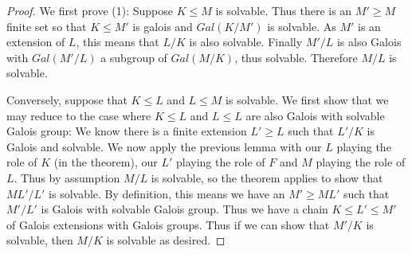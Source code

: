 \documentclass[twoside, a4paper, 10pt]{amsart}
\begin{document}
\begin{proof} We first prove (1): Suppose $K \leq M$ is solvable. Thus there is an $M' \geq M$ finite set so that $K \leq M'$ is galois and $Gal(K/M')$ is solvable. As $M'$ is an extension of $L$, this means that $L/K$ is also solvable. Finally $M'/L$ is also Galois with $Gal(M'/L)$ a subgroup of $Gal(M/K)$, thus solvable. Therefore $M/L$ is solvable.

Conversely, suppose that $K \leq L$ and $L \leq M$ is solvable. We first show that we may reduce to the case where $K \leq L$ and $L \leq L$ are also Galois with solvable Galois group: We know there is a finite extension $L' \geq L$ such that $L'/K$ is Galois and solvable. We now apply the previous lemma with our $L$ playing the role of $K$ (in the theorem), our $L'$ playing the role of $F$ and $M$ playing the role of $L$. Thus by assumption $M/L$ is solvable, so the theorem applies to show that $ML'/L'$ is solvable. By definition, this means we have an $M' \geq ML'$ such that $M'/L'$ is Galois with solvable Galois group. Thus we have a chain $K \leq L' \leq M'$ of Galois extensions with Galois groups. Thus if we can show that $M'/K$ is solvable, then $M/K$ is solvable as desired.


\end{proof}
\end{document}
